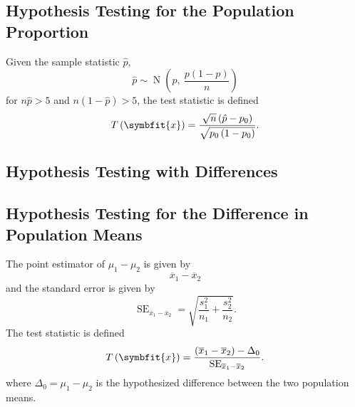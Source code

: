 \documentclass{article}
\begin{document}
\begin{multicols}{3}
\subsection{Hypothesis Testing for the Population Proportion}
Given the sample statistic \(\hat{p}\),
\begin{equation*}
    \hat{p} \sim \operatorname{N}\left( p,\: \frac{p\left( 1 - p \right)}{n} \right)
\end{equation*}
for \(n \hat{p} > 5\) and \(n \left( 1 - \hat{p} \right) > 5\),
the test statistic is defined
\begin{equation*}
    T\left( \symbfit{x} \right) = \frac{\sqrt{n} \left( \hat{p} - p_0 \right)}{\sqrt{p_0 \left( 1 - p_0 \right)}}.
\end{equation*}
\subsection{Hypothesis Testing with Differences}
\subsection{Hypothesis Testing for the Difference in Population Means}
The point estimator of \(\mu_1 - \mu_2\) is given by
\begin{equation*}
    \overline{x}_1 - \overline{x}_2
\end{equation*}
and the standard error is given by
\begin{equation*}
    \operatorname{SE}_{\overline{x}_1 - \overline{x}_2} = \sqrt{\frac{s_1^2}{n_1} + \frac{s_2^2}{n_2}}.
\end{equation*}
The test statistic is defined
\begin{equation*}
    T\left( \symbfit{x} \right) = \frac{\left( \overline{x}_1 - \overline{x}_2 \right) - \Delta_0}{\operatorname{SE}_{\overline{x}_1 - \overline{x}_2}}.
\end{equation*}
where \(\Delta_0 = \mu_1 - \mu_2\) is the hypothesized difference between the two population means.

\end{multicols}
\end{document}
